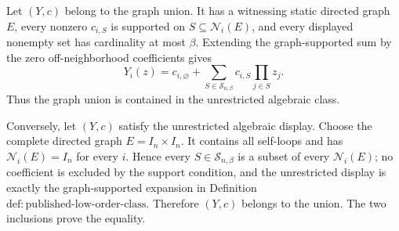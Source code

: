 Let \((Y,c)\) belong to the graph union.  It has a witnessing static directed graph \(E\), every nonzero \(c_{i,S}\) is supported on \(S\subseteq\mathcal N_i(E)\), and every displayed nonempty set has cardinality at most \(\beta\).  Extending the graph-supported sum by the zero off-neighborhood coefficients gives
\[
Y_i(z)=c_{i,\varnothing}+
\sum_{S\in\mathcal S_{n,\beta}}c_{i,S}\prod_{j\in S}z_j.
\]
Thus the graph union is contained in the unrestricted algebraic class.

Conversely, let \((Y,c)\) satisfy the unrestricted algebraic display.  Choose the complete directed graph \(E=I_n\times I_n\).  It contains all self-loops and has \(\mathcal N_i(E)=I_n\) for every \(i\).  Hence every \(S\in\mathcal S_{n,\beta}\) is a subset of every \(\mathcal N_i(E)\); no coefficient is excluded by the support condition, and the unrestricted display is exactly the graph-supported expansion in Definition~\(\mathrm{def{:}published\text{-}low\text{-}order\text{-}class}\).  Therefore \((Y,c)\) belongs to the union.  The two inclusions prove the equality.